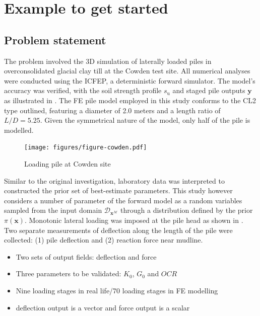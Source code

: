 \documentclass{ol-softwaremanual}
\begin{document}
\section{Example to get started}
\subsection*{Problem statement}
The problem involved the 3D simulation of laterally loaded piles in overconsolidated glacial clay till at the Cowden test site. All numerical analyses were conducted using the ICFEP, a deterministic forward simulator. The model's accuracy was verified, with the soil strength profile $s_{\text{u}}$ and staged pile outputs $\boldsymbol{y}$ as illustrated in . The FE pile model employed in this study conforms to the CL2 type outlined, featuring a diameter of 2.0 meters and a length ratio of $L/D = 5.25$. Given the symmetrical nature of the model, only half of the pile is modelled.
 \begin{figure}[htbp]
    \centering
    \texttt{[image: figures/figure-cowden.pdf]}
    \caption{Loading pile at Cowden site}
    \label{fig: cowdensite}
\end{figure}

Similar to the original investigation, laboratory data was interpreted to constructed the prior set of best-estimate parameters. This study however considers a number of parameter of the forward model as a random variables sampled from the input domain $\mathcal{D}_{\boldsymbol{x}^\mathcal{M}}$ through a distribution defined by the prior $\pi(\boldsymbol{x})$. Monotonic lateral loading was imposed at the pile head as shown in . Two separate measurements of deflection along the length of the pile were collected: (1) pile deflection and (2) reaction force near mudline.
\begin{itemize}
    \item Two sets of output fields: deflection and force
    \item Three parameters to be validated: $K_0$, $G_0$ and $OCR$
    \item Nine loading stages in real life/70 loading stages in FE modelling
    \item deflection output is a vector and force output is a scalar
\end{itemize}
\end{document}
